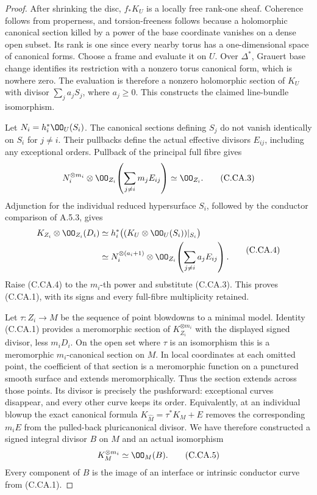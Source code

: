 \begin{proof}
After shrinking the disc, $f_*K_U$ is a locally free
rank-one sheaf. Coherence follows from properness, and
torsion-freeness follows because a holomorphic canonical
section killed by a power of the base coordinate vanishes
on a dense open subset. Its rank is one since every nearby
torus has a one-dimensional space of canonical forms.
Choose a frame and evaluate it on $U$. Over $\Delta^*$,
Grauert base change identifies its restriction with a
nonzero torus canonical form, which is nowhere zero.
The evaluation is therefore a nonzero holomorphic section
of $K_U$ with divisor $\sum_j a_jS_j$, where $a_j\ge0$.
This constructs the claimed line-bundle isomorphism.

Let $N_i=h_i^*\OO_U(S_i)$. The canonical sections defining
$S_j$ do not vanish identically on $S_i$ for $j\ne i$.
Their pullbacks define the actual effective divisors
$E_{ij}$, including any exceptional orders. Pullback of
the principal full fibre gives
\[
 N_i^{\otimes m_i}\otimes
 \OO_{Z_i}\!\left(\sum_{j\ne i}m_jE_{ij}\right)
                         \simeq\OO_{Z_i}.               \tag{C.CA.3}
\]
Adjunction for the individual reduced hypersurface $S_i$,
followed by the conductor comparison of A.5.3, gives
\[
 \begin{split}
 K_{Z_i}\otimes\OO_{Z_i}(D_i)
   &\simeq h_i^*\bigl((K_U\otimes\OO_U(S_i))|_{S_i}\bigr)\\
   &\simeq N_i^{\otimes(a_i+1)}\otimes
      \OO_{Z_i}\!\left(\sum_{j\ne i}a_jE_{ij}\right).
 \end{split}                                             \tag{C.CA.4}
\]
Raise (C.CA.4) to the $m_i$-th power and substitute
(C.CA.3). This proves (C.CA.1), with its signs and every
full-fibre multiplicity retained.

Let $\tau:Z_i\to M$ be the sequence of point blowdowns
to a minimal model. Identity (C.CA.1) provides a
meromorphic section of $K_{Z_i}^{\otimes m_i}$ with the
displayed signed divisor, less $m_iD_i$. On the open set
where $\tau$ is an isomorphism this is a meromorphic
$m_i$-canonical section on $M$. In local coordinates at
each omitted point, the coefficient of that section is a
meromorphic function on a punctured smooth surface and
extends meromorphically. Thus the section extends across
those points. Its divisor is precisely the pushforward:
exceptional curves disappear, and every other curve
keeps its order. Equivalently, at an individual blowup
the exact canonical formula
$K_{\widehat M}=\tau^*K_M+E$ removes the corresponding
$m_iE$ from the pulled-back pluricanonical divisor.
We have therefore constructed a signed integral divisor
$B$ on $M$ and an actual isomorphism
\[
                         K_M^{\otimes m_i}\simeq\OO_M(B).
                                                               \tag{C.CA.5}
\]
Every component of $B$ is the image of an interface or
intrinsic conductor curve from (C.CA.1).


\end{proof}
